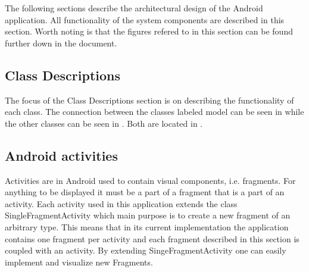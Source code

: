 The following sections describe the architectural design of the Android application. All functionality of the system components are described in this section. Worth noting is that the figures refered to in this section can be found further down in the document.

\subsection{Class Descriptions}\label{sec:and_classdescription}
The focus of the Class Descriptions section is on describing the functionality of each class.
The connection between the classes labeled model can be seen in
 while the other classes can be seen in
. Both are located in .

\subsection{Android activities} 
Activities are in Android used to contain visual components, i.e. fragments. For anything to be
displayed it must be a part of a fragment that is a part of an activity. Each
activity used in this application extends the class SingleFragmentActivity which
main purpose is to create a new fragment of an arbitrary type.
This means that in its current implementation the application contains
one fragment per activity and each fragment described in this section is coupled
with an activity. By extending SingeFragmentActivity one can easily implement and visualize
new Fragments.

\newpage

